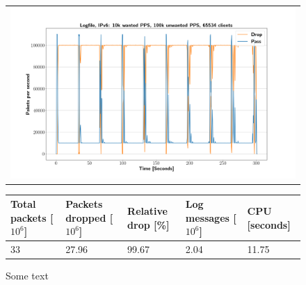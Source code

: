 \begin{figure}[!h]
	\label{fig:simplefail2ban:disk:ip6:100k}
	\centering
	\scriptsize
	\begin{tabular}{c}
    	\centerline{\includegraphics[width=1.2\textwidth]{images/simplefail2ban_disk_ipv6_v10k_iv100k_c65534.png}}
	\end{tabular}
	\begin{tabular}{lllll}
		\toprule
		\textbf{Total packets [$10^6$]} & \textbf{Packets dropped [$10^6$]} & \textbf{Relative drop [\%]} & \textbf{Log messages [$10^6$]} & \textbf{CPU [seconds]} \\ \midrule 
		33 & 27.96 & 99.67 & 2.04 & 11.75 \\
		\bottomrule
	\end{tabular}
	\caption[Simplefail2ban, Logfile IPv6, 100k \ac{PPS}]{Some text}
\end{figure}

